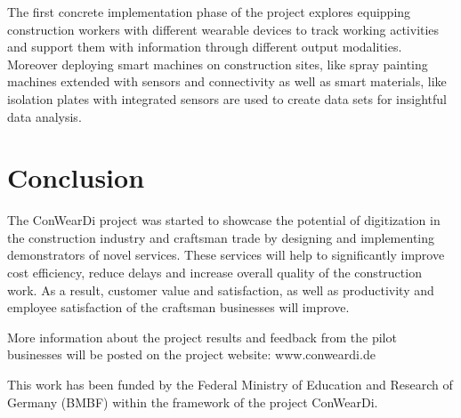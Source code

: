 The first concrete implementation phase of the project explores equipping construction workers with different wearable devices to track working activities and support them with information through different output modalities.
Moreover deploying smart machines on construction sites, like spray painting machines extended with sensors and connectivity as well as smart materials, like isolation plates with integrated sensors are used to create data sets for insightful data analysis.

\section{Conclusion}
The ConWearDi project was started to showcase the potential of digitization in the construction industry and craftsman trade by designing and implementing demonstrators of novel services.
These services will help to significantly improve cost efficiency, reduce delays and increase overall quality of the construction work.
As a result, customer value and satisfaction, as well as productivity and employee satisfaction of the craftsman businesses will improve. 

More information about the project results and feedback from the pilot businesses will be posted on the project website: www.conweardi.de

\begin{acks}
  This work has been funded by the Federal Ministry of Education and Research of Germany (BMBF) within the framework of the project ConWearDi.
\end{acks}
